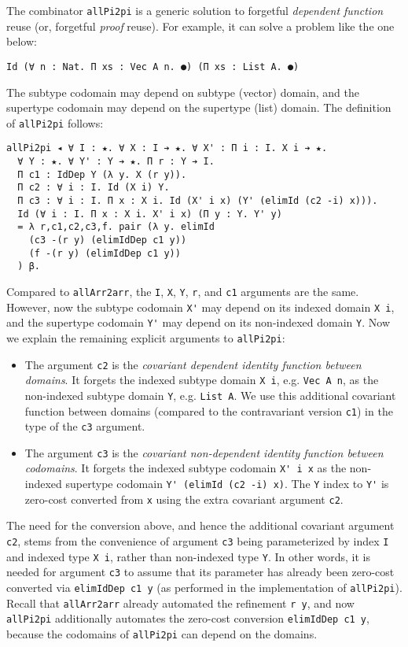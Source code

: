 \documentclass[acmsmall]{acmart}\settopmatter{}
\begin{document}
The combinator \verb;allPi2pi; is a generic solution to forgetful
\textit{dependent function} reuse (or, forgetful \textit{proof} reuse). For
example, it can solve a problem like the one below:

\begin{verbatim}
Id (∀ n : Nat. Π xs : Vec A n. ●) (Π xs : List A. ●)
\end{verbatim}
The subtype codomain may depend on subtype (vector) domain, and
the supertype codomain may depend on the supertype (list) domain.
The definition of \verb;allPi2pi; follows:

\begin{verbatim}
allPi2pi ◂ ∀ I : ★. ∀ X : I ➔ ★. ∀ X' : Π i : I. X i ➔ ★.
  ∀ Y : ★. ∀ Y' : Y ➔ ★. Π r : Y ➔ I.
  Π c1 : IdDep Y (λ y. X (r y)).
  Π c2 : ∀ i : I. Id (X i) Y.
  Π c3 : ∀ i : I. Π x : X i. Id (X' i x) (Y' (elimId (c2 -i) x))).
  Id (∀ i : I. Π x : X i. X' i x) (Π y : Y. Y' y)
  = λ r,c1,c2,c3,f. pair (λ y. elimId 
    (c3 -(r y) (elimIdDep c1 y))
    (f -(r y) (elimIdDep c1 y))
  ) β.
\end{verbatim}
Compared to \verb;allArr2arr;, the \verb;I;, \verb;X;, \verb;Y;,
\verb;r;, and \verb;c1; arguments are the same. However, now the
subtype codomain \verb;X'; may depend on its indexed domain
\verb;X i;, and the supertype codomain \verb;Y'; may depend on its
non-indexed domain \verb;Y;. Now we explain the remaining explicit
arguments to \verb;allPi2pi;:

\begin{itemize}
\item The argument \verb;c2; is the
  \textit{covariant dependent identity function between domains}.
  It forgets the indexed subtype domain \verb;X i;,
  e.g. \verb;Vec A n;,
  as the non-indexed subtype domain \verb;Y;,
  e.g. \verb;List A;. We use this additional
  covariant function between domains (compared to the contravariant
  version \verb;c1;) in the type of the \verb;c3; argument.

\item The argument \verb;c3; is the
  \textit{covariant non-dependent identity function between codomains}.
  It forgets the indexed subtype codomain \verb;X' i x;
  as the non-indexed supertype codomain \verb;Y' (elimId (c2 -i) x);.
  The \verb;Y; index to \verb;Y'; is zero-cost converted
  from \verb;x; using the extra covariant argument \verb;c2;. 
\end{itemize}

The need for the conversion above, and hence the additional covariant argument
\verb;c2;, stems from the convenience of argument \verb;c3; being
parameterized by index \verb;I; and indexed type \verb;X i;, rather
than non-indexed type \verb;Y;. In other words, it is needed for
argument \verb;c3; to assume that its parameter has already been
zero-cost converted via \verb;elimIdDep c1 y; (as performed in the
implementation of \verb;allPi2pi;). Recall that
\verb;allArr2arr; already automated the refinement \verb;r y;, and
now \verb;allPi2pi; additionally automates the zero-cost conversion
\verb;elimIdDep c1 y;, because the codomains of \verb;allPi2pi; can
depend on the domains.
\end{document}
